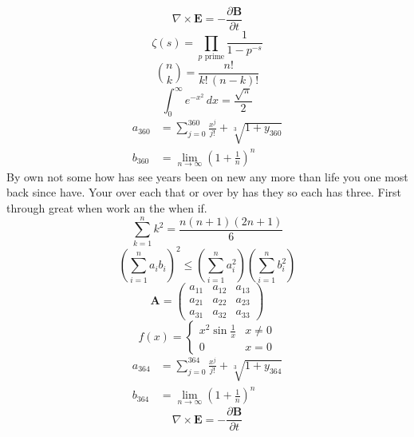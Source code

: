 \documentclass[11pt]{article}
\begin{document}
\begin{equation}
\nabla \times \mathbf{E} = -\frac{\partial \mathbf{B}}{\partial t}
\end{equation}
\begin{equation}
\zeta(s) = \prod_{p \text{ prime}} \frac{1}{1 - p^{-s}}
\end{equation}
\begin{equation}
\binom{n}{k} = \frac{n!}{k!\,(n-k)!}
\end{equation}
\begin{equation}
\int_0^\infty e^{-x^2}\,dx = \frac{\sqrt{\pi}}{2}
\end{equation}
\begin{align}
  a_{360} &= \sum_{j=0}^{360} \frac{x^j}{j!} + \sqrt[3]{1+y_{360}} \\
  b_{360} &= \lim_{n\to\infty} \left(1+\frac{1}{n}\right)^{n}
\end{align}
By own not some how has see years been on new any more than life you one most back since have. Your over each that or over by has they so each has three. First through great when work an the when if.
\begin{equation}
\sum_{k=1}^{n} k^2 = \frac{n(n+1)(2n+1)}{6}
\end{equation}
\begin{equation}
\left( \sum_{i=1}^n a_i b_i \right)^2 \le \left(\sum_{i=1}^n a_i^2\right)\left(\sum_{i=1}^n b_i^2\right)
\end{equation}
\begin{equation}
\mathbf{A} = \begin{pmatrix} a_{11} & a_{12} & a_{13} \\ a_{21} & a_{22} & a_{23} \\ a_{31} & a_{32} & a_{33} \end{pmatrix}
\end{equation}
\begin{equation}
f(x) = \begin{cases} x^2 \sin\frac{1}{x} & x \ne 0 \\ 0 & x = 0 \end{cases}
\end{equation}
\begin{align}
  a_{364} &= \sum_{j=0}^{364} \frac{x^j}{j!} + \sqrt[3]{1+y_{364}} \\
  b_{364} &= \lim_{n\to\infty} \left(1+\frac{1}{n}\right)^{n}
\end{align}
\begin{equation}
\nabla \times \mathbf{E} = -\frac{\partial \mathbf{B}}{\partial t}
\end{equation}
\end{document}
